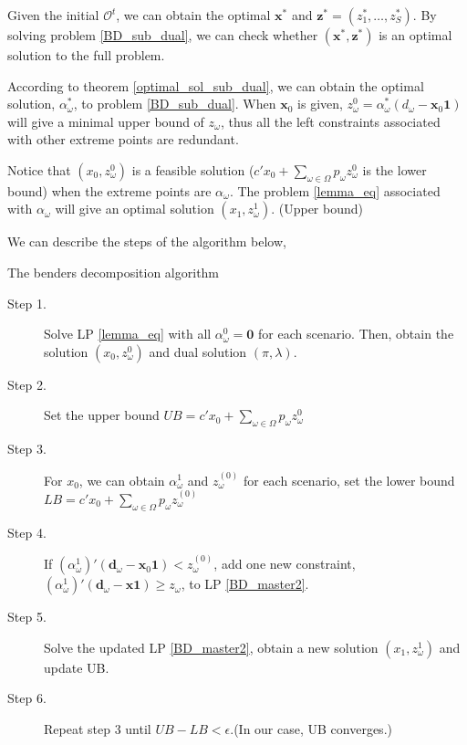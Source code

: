 Given the initial $\mathcal{O}^{t}$, we can obtain the optimal $\mathbf{x}^{*}$ and $\mathbf{z}^{*}=(z^{*}_1,\ldots, z^{*}_S)$. By solving problem \eqref{BD_sub_dual}, we can check whether $(\mathbf{x}^{*}, \mathbf{z}^{*})$ is an optimal solution to the full problem.


According to theorem \ref{optimal_sol_sub_dual}, we can obtain the optimal solution, $\alpha_{\omega}^{*}$, to problem \eqref{BD_sub_dual}. When $\mathbf{x}_0$ is given, $z_{\omega}^{0} = \alpha_{\omega}^{*}(d_{\omega} - \mathbf{x}_0 \mathbf{1})$ will give a minimal upper bound of $z_{\omega}$, thus all the left constraints associated with other extreme points are redundant.

Notice that $(x_0, z_{\omega}^{0})$ is a feasible solution ($c{'} x_0 + \sum_{\omega \in \Omega} p_{\omega} z_{\omega}^{0}$ is the lower bound) when the extreme points are $\alpha_{\omega}$. The problem \eqref{lemma_eq} associated with $\alpha_{\omega}$ will give an optimal solution $(x_1, z_{\omega}^{1})$. (Upper bound)


We can describe the steps of the algorithm below,

\begin{algorithm}[H]\label{cut_algo}
  \caption{The benders decomposition algorithm}
    \begin{description}
    \item[Step 1.] Solve LP \eqref{lemma_eq} with all $\alpha_{\omega}^0 = \mathbf{0}$ for each scenario.
    Then, obtain the solution $(x_0, z_{\omega}^{0})$ and dual solution $(\pi, \lambda)$.

    \item[Step 2.] Set the upper bound $UB = c{'} x_0 + \sum_{\omega \in \Omega} p_{\omega} z_{\omega}^{0}$ 
    \item[Step 3.] 
    For $x_0$, we can obtain $\alpha_{\omega}^{1}$ and $z_{\omega}^{(0)}$ for each scenario, set the lower bound $LB = c{'} x_0 + \sum_{\omega \in \Omega} p_{\omega} z_{\omega}^{(0)}$

    \item[Step 4.]
    If $(\alpha_{\omega}^{1}){'}(\mathbf{d}_{\omega}- \mathbf{x}_0 \mathbf{1}) < z_{\omega}^{(0)}$, add one new constraint, $(\alpha_{\omega}^{1}){'}(\mathbf{d}_{\omega}- \mathbf{x} \mathbf{1}) \geq z_{\omega}$, to LP \eqref{BD_master2}.

    \item[Step 5.] Solve the updated LP \eqref{BD_master2}, obtain a new solution $(x_1, z_{\omega}^{1})$ and update UB.
    \item[Step 6.] Repeat step 3 until $UB - LB < \epsilon$.(In our case, UB converges.)
   \end{description}
  \end{algorithm}

